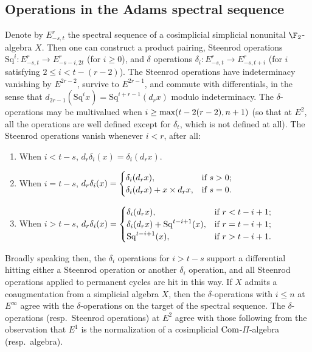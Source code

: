 \documentclass[10pt]{article}
\newcommand{\Sq}{\mathrm{Sq}}
\begin{document}
\begin{AdamsSSEQ operations final}

\pagebreak
\section{Operations in the Adams spectral sequence}
\begin{thm}
Denote by $E^r_{-s,t}$ the spectral sequence of a cosimplicial simplicial nonunital $\F_2$-algebra $X$. Then one can construct a product pairing, Steenrod operations $\Sq^i:E^r_{-s,t}\to E^r_{-s-i,2t}$ (for $i\geq0$), and $\delta$ operations $\delta_i:E^r_{-s,t}\to E^r_{-s,t+i}$ (for $i$ satisfying $2\leq i<t-(r-2)$). The Steenrod operations have indeterminacy vanishing by $E^{2r-2}$, survive to $E^{2r-1}$, and commute with differentials, in the sense that $d_{2r-1}(\Sq^ix)=\Sq^{i+r-1}(d_rx)$ modulo indeterminacy. The $\delta$-operations may be multivalued when $i\geq \textup{max}(t-2(r-2),n+1)$ (so that at $E^2$, all the operations are well defined except for $\delta_t$, which is not defined at all). The Steenrod operations vanish whenever $i<r$, after all:
\begin{enumerate}\squishlist
\setlength{\parindent}{.25in}
\item When $i<t-s$, $d_r\delta_i(x)=\delta_i(d_rx)$.
\item When $i=t-s$, $d_r\delta_i(x)=\begin{cases}
\delta_i(d_rx),&\textup{if }s>0;\\
\delta_i(d_rx)+x\times d_rx,&\textup{if }s=0.
\end{cases}$
\item When $i>t-s$, $d_r\delta_i(x)=\begin{cases}
\delta_i(d_rx),&\textup{if }r<t-i+1;\\
\delta_i(d_rx)+\Sq^{t-i+1}(x),&\textup{if }r=t-i+1;\\
\Sq^{t-i+1}(x),&\textup{if }r>t-i+1.\\
\end{cases}$
\end{enumerate}
Broadly speaking then, the $\delta_i$ operations for $i>t-s$ support a differential hitting either a Steenrod operation or another $\delta_i$ operation, and all Steenrod operations applied to permanent cycles are hit in this way. If $X$ admits a coaugmentation from a simplicial algebra $X$, then the $\delta$-operations with $i\leq n$ at $E^\infty$ agree with the $\delta$-operations on the target of the spectral sequence. The $\delta$-operations (resp.\ Steenrod operations)  at $E^2$ agree with those following from the observation that $E^1$ is the normalization of a cosimplicial $\textup{Com}$-$\Pi$-algebra (resp.\ algebra).


\end{thm}
\end{AdamsSSEQ operations final}
\end{document}
